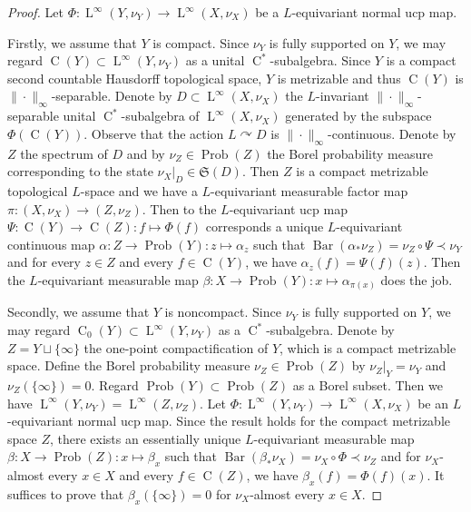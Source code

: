 \documentclass[10pt,a4paper]{amsart}
\newcommand{\Prob}{\operatorname{Prob}}
\newcommand{\bary}{\operatorname{Bar}}
\newcommand{\rC}{\operatorname{C}}
\newcommand{\rL}{\operatorname{ L}}
\begin{document}
\begin{proof} Let $\Phi : \rL^\infty(Y, \nu_Y) \to \rL^\infty(X, \nu_X)$ be a $L$-equivariant normal ucp map.

Firstly, we assume that $Y$ is compact. Since $\nu_Y$ is fully supported on $Y$, we may regard $\rC(Y) \subset \rL^\infty(Y, \nu_Y)$ as a unital $\rC^*$-subalgebra. Since $Y$ is a compact second countable Hausdorff topological space, $Y$ is metrizable and thus $\rC(Y)$ is $\|\cdot\|_\infty$-separable. Denote by $D \subset \rL^\infty(X, \nu_X)$ the $L$-invariant $\|\cdot\|_\infty$-separable unital $\rC^*$-subalgebra of $\rL^\infty(X, \nu_X)$ generated by the subspace $\Phi(\rC(Y))$. Observe that the action $L \curvearrowright D$ is $\|\cdot\|_\infty$-continuous. Denote by $Z$ the spectrum of $D$ and by $\nu_Z \in \Prob(Z)$ the Borel probability measure corresponding to the state $\nu_X|_{D} \in \mathfrak S(D)$. Then $Z$ is a compact metrizable topological $L$-space and we have  a $L$-equivariant measurable factor map $\pi : (X, \nu_X) \to (Z, \nu_Z)$. Then to the $L$-equivariant ucp map $\Psi : \rC(Y) \to \rC(Z) : f \mapsto \Phi(f)$ corresponds a unique $L$-equivariant continuous map $\alpha : Z \to \Prob(Y) : z \mapsto \alpha_z$ such that $\bary(\alpha_\ast \nu_Z) = \nu_Z \circ \Psi \prec \nu_Y$ and for every $z \in Z$ and every $f \in \rC(Y)$, we have $\alpha_z(f) = \Psi(f)(z)$. Then the $L$-equivariant measurable map $\beta : X \to \Prob(Y) : x \mapsto \alpha_{\pi(x)}$ does the job.

Secondly, we assume that $Y$ is noncompact. Since $\nu_Y$ is fully supported on $Y$, we may regard $\rC_0(Y) \subset \rL^\infty(Y, \nu_Y)$ as a $\rC^*$-subalgebra. Denote by $Z = Y \sqcup \{\infty\}$ the one-point compactification of $Y$, which is a compact metrizable space. Define the Borel probability measure $\nu_Z \in \Prob(Z)$ by $\nu_Z|_Y = \nu_Y$ and $\nu_Z(\{\infty\}) = 0$. Regard $\Prob(Y) \subset \Prob(Z)$ as a Borel subset. Then we have $\rL^\infty(Y, \nu_Y) = \rL^\infty(Z, \nu_Z)$. Let $\Phi : \rL^\infty(Y, \nu_Y) \to \rL^\infty(X, \nu_X)$ be an $L$-equivariant normal ucp map. Since the result holds for the compact metrizable space $Z$, there exists an essentially unique $L$-equivariant measurable map $\beta : X \to \Prob(Z) : x \mapsto \beta_x$ such that $\bary(\beta_\ast \nu_X) = \nu_X \circ \Phi \prec \nu_Z$ and for $\nu_X$-almost every $x \in X$ and every $f \in \rC(Z)$, we have $\beta_x(f) = \Phi(f)(x)$. It suffices to prove that $\beta_x(\{\infty\}) = 0$ for $\nu_X$-almost every $x \in X$.


\end{proof}
\end{document}
